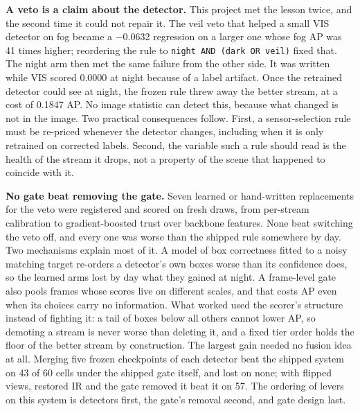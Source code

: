 \documentclass[10pt]{article}
\begin{document}
\textbf{A veto is a claim about the detector.} This project met the lesson twice, and the second time it could not repair it. The veil veto that helped a small VIS detector on fog became a $-$0.0632 regression on a larger one whose fog AP was 41 times higher; reordering the rule to \texttt{night AND (dark OR veil)} fixed that. The night arm then met the same failure from the other side. It was written while VIS scored 0.0000 at night because of a label artifact. Once the retrained detector could see at night, the frozen rule threw away the better stream, at a cost of 0.1847 AP. No image statistic can detect this, because what changed is not in the image. Two practical consequences follow. First, a sensor-selection rule must be re-priced whenever the detector changes, including when it is only retrained on corrected labels. Second, the variable such a rule should read is the health of the stream it drops, not a property of the scene that happened to coincide with it.

\textbf{No gate beat removing the gate.} Seven learned or hand-written replacements for the veto were registered and scored on fresh draws, from per-stream calibration to gradient-boosted trust over backbone features. None beat switching the veto off, and every one was worse than the shipped rule somewhere by day. Two mechanisms explain most of it. A model of box correctness fitted to a noisy matching target re-orders a detector's own boxes worse than its confidence does, so the learned arms lost by day what they gained at night. A frame-level gate also pools frames whose scores live on different scales, and that costs AP even when its choices carry no information. What worked used the scorer's structure instead of fighting it: a tail of boxes below all others cannot lower AP, so demoting a stream is never worse than deleting it, and a fixed tier order holds the floor of the better stream by construction. The largest gain needed no fusion idea at all. Merging five frozen checkpoints of each detector beat the shipped system on 43 of 60 cells under the shipped gate itself, and lost on none; with flipped views, restored IR and the gate removed it beat it on 57. The ordering of levers on this system is detectors first, the gate's removal second, and gate design last.
\end{document}
